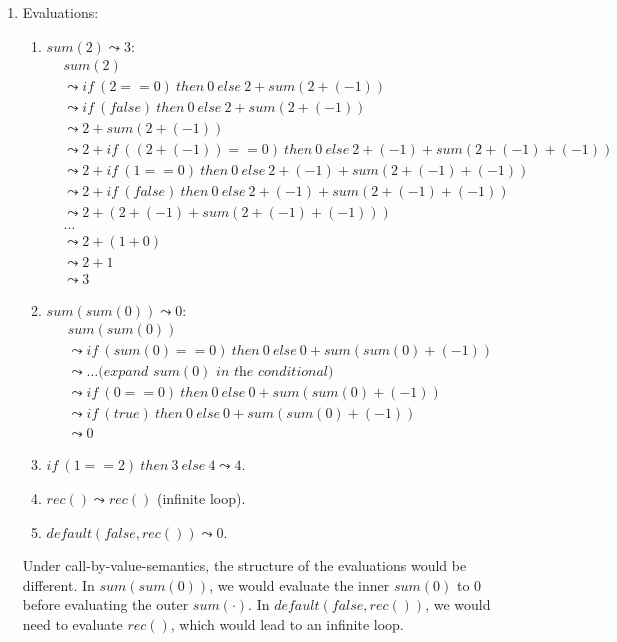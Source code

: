 \begin{exercise}{}
\begin{solution}
\begin{enumerate}
      \item Evaluations:
      \begin{enumerate}
        \item \(sum(2) \leadsto 3\):
          \begin{align*}
            &sum(2)\\
            &\leadsto if ~(2 == 0) ~ then ~ 0 ~ else ~ 2 + sum(2 + (-1))\\
            &\leadsto if ~(false) ~ then ~ 0 ~ else ~ 2 + sum(2 + (-1))\\
            &\leadsto 2 + sum(2 + (-1))\\
            &\leadsto 2 + if ~((2 + (-1)) == 0) ~ then ~ 0 ~ else ~ 2 + (-1) + sum(2 + (-1) + (-1))\\
            &\leadsto 2 + if ~(1 == 0) ~ then ~ 0 ~ else ~ 2 + (-1) + sum(2 + (-1) + (-1))\\
            &\leadsto 2 + if ~(false) ~ then ~ 0 ~ else ~ 2 + (-1) + sum(2 + (-1) + (-1))\\
            &\leadsto 2 + (2 + (-1) + sum(2 + (-1) + (-1)))\\
            & \ldots \\
            &\leadsto 2 + (1 + 0) \\
            &\leadsto 2 + 1 \\
            &\leadsto 3
          \end{align*}
        \item \(sum(sum(0)) \leadsto 0\):
        \begin{align*}
          &sum(sum(0))\\
          &\leadsto if ~(sum(0) == 0) ~ then ~ 0 ~ else ~ 0 + sum(sum(0) + (-1))\\
          &\leadsto \ldots \textit{(expand \(sum(0)\) in the conditional)} \\
          &\leadsto if ~(0 == 0) ~ then ~ 0 ~ else ~ 0 + sum(sum(0) + (-1))\\
          &\leadsto if ~(true) ~ then ~ 0 ~ else ~ 0 + sum(sum(0) + (-1))\\
          &\leadsto 0
        \end{align*}
        \item \(if ~(1 == 2) ~ then ~ 3 ~ else ~ 4 \leadsto 4\).
        \item \(rec() \leadsto rec()\) (infinite loop).
        \item \(default(false, rec()) \leadsto 0\).
      \end{enumerate}

      Under call-by-value-semantics, the structure of the evaluations would be
      different. In \(sum(sum(0))\), we would evaluate the inner \(sum(0)\) to
      \(0\) before evaluating the outer \(sum(\cdot)\). In \(default(false,
      rec())\), we would need to evaluate \(rec()\), which would lead to an
      infinite loop.
    \end{enumerate}
        
  \end{solution}
  
\end{exercise}
